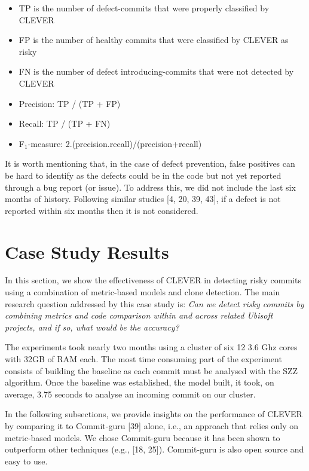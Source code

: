 \documentclass[sigconf]{acmart}
\providecommand{\tightlist}{%
  \setlength{\itemsep}{0pt}\setlength{\parskip}{0pt}}
\begin{document}
\begin{itemize}
\tightlist
\item
  TP is the number of defect-commits that were properly classified by
  CLEVER
\item
  FP is the number of healthy commits that were classified by CLEVER as
  risky
\item
  FN is the number of defect introducing-commits that were not detected
  by CLEVER
\item
  Precision: TP / (TP + FP)
\item
  Recall: TP / (TP + FN)
\item
  F\(_1\)-measure: 2.(precision.recall)/(precision+recall)
\end{itemize}

It is worth mentioning that, in the case of defect prevention, false
positives can be hard to identify as the defects could be in the code
but not yet reported through a bug report (or issue). To address this,
we did not include the last six months of history. Following similar
studies {[}4, 20, 39, 43{]}, if a defect is not reported within six
months then it is not considered.

\section{Case Study Results}\label{sec:result}

In this section, we show the effectiveness of CLEVER in detecting risky
commits using a combination of metric-based models and clone detection.
The main research question addressed by this case study is: \emph{Can we
detect risky commits by combining metrics and code comparison within and
across related Ubisoft projects, and if so, what would be the accuracy?}

The experiments took nearly two months using a cluster of six 12 3.6 Ghz
cores with 32GB of RAM each. The most time consuming part of the
experiment consists of building the baseline as each commit must be
analysed with the SZZ algorithm. Once the baseline was established, the
model built, it took, on average, 3.75 seconds to analyse an incoming
commit on our cluster.

In the following subsections, we provide insights on the performance of
CLEVER by comparing it to Commit-guru {[}39{]} alone, i.e., an approach
that relies only on metric-based models. We chose Commit-guru because it
has been shown to outperform other techniques (e.g., {[}18, 25{]}).
Commit-guru is also open source and easy to use.
\end{document}
